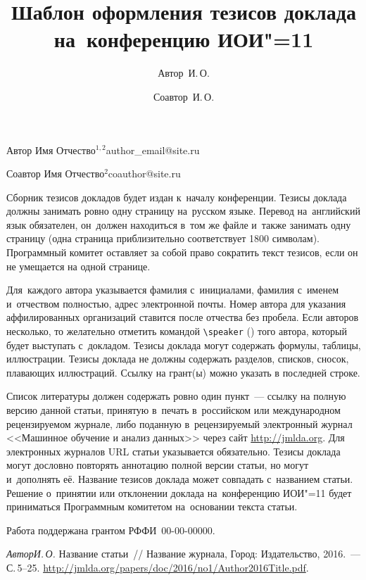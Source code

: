\documentclass[twoside]{article}
\begin{document}
\title{Шаблон оформления тезисов доклада на~конференцию ИОИ"=11}
\author{Автор~И.\,О.}{Автор Имя Отчество$^{1, 2}$}{author\_email@site.ru}
\author{Соавтор~И.\,О.}{Соавтор Имя Отчество$^2$\speaker}{coauthor@site.ru}
\Russian
\maketitle

Сборник тезисов докладов будет издан к~началу конференции.
Тезисы доклада должны занимать ровно одну страницу на~русском языке.
Перевод на~английский язык обязателен,
он~должен находиться в~том же файле и~также занимать одну страницу
(одна страница приблизительно соответствует 1800 символам).
Программный комитет оставляет за собой право сократить текст тезисов,
если он не умещается на одной странице.

Для~каждого автора указывается фамилия с~инициалами,
фамилия с~именем и~отчеством полностью,
адрес электронной почты.
Номер автора для указания аффилированных организаций ставится после отчества без пробела.
Если авторов несколько, то желательно отметить командой \verb|\speaker| (\speaker) того автора, который будет выступать с~докладом.
Тезисы доклада могут содержать формулы, таблицы, иллюстрации.
Тезисы доклада не должны содержать разделов, списков, сносок, плавающих иллюстраций.
Ссылку на грант(ы) можно указать в последней строке.

Список литературы должен содержать ровно один пункт~---
ссылку на полную версию данной статьи,
принятую в~печать в~российском или международном рецензируемом журнале,
либо поданную в~рецензируемый электронный журнал <<Машинное обучение и анализ данных>>
через сайт \url{http://jmlda.org}.
Для электронных журналов URL статьи указывается обязательно.
Тезисы доклада могут дословно повторять аннотацию полной версии статьи, но могут и~дополнять её.
Название тезисов доклада может совпадать с~названием статьи.
Решение о~принятии или отклонении доклада на~конференцию ИОИ"=11
будет приниматься Программным комитетом на~основании текста статьи.

Работа поддержана грантом РФФИ \No\,00-00-00000.

\begin{thebibliography}{1}
    \emph{Автор\;И.\,О.}
    Название статьи~//
    Название журнала,
    Город: Издательство, 2016.~--- С.\,5--25. %
    \url{http://jmlda.org/papers/doc/2016/no1/Author2016Title.pdf}.
\end{thebibliography}
\end{document}
